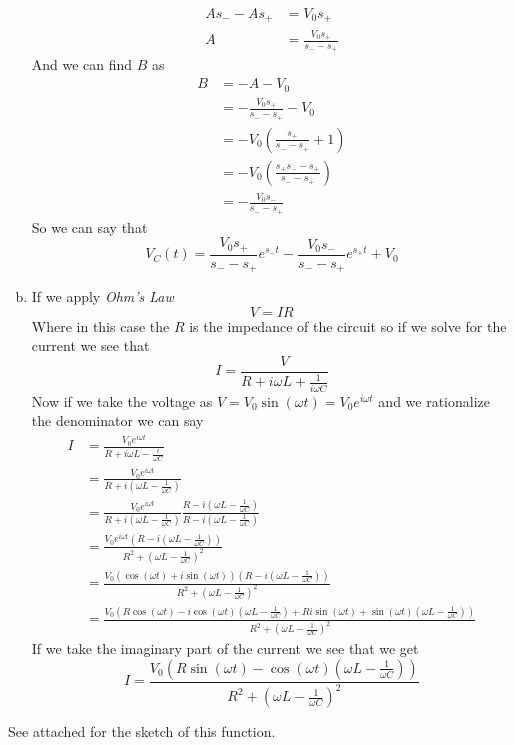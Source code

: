 \documentclass[11pt]{article}
\numberwithin{equation}{section}
\begin{document}
\begin{enumerate}[(a)]
\begin{align*}
As_- - As_+ &= V_0s_+\\
A &= \frac{V_0s_+}{s_- -s_+}
\end{align*}
And we can find $B$ as
\begin{align*}
B &= -A - V_0\\
&= -\frac{V_0s_+}{s_- -s_+} - V_0\\
&= -V_0\left(\frac{s_+}{s_- -s_+} +1\right)\\
&= -V_0\left(\frac{s_+ s_- - s_+}{s_- -s_+}\right)\\
&= -\frac{V_0s_-}{s_- -s_+}
\end{align*}
So we can say that
$$V_C(t) = \frac{V_0s_+}{s_- -s_+}e^{s_-t}-\frac{V_0s_-}{s_- -s_+}e^{s_+t}+V_0$$

\item
If we apply \emph{Ohm's Law}
\begin{equation}
V = IR
\end{equation}
Where in this case the $R$ is the impedance of the circuit so if we solve for the current we see that
$$I = \frac{V}{R+i\omega L + \frac{1}{i\omega C}}$$
Now if we take the voltage as $V = V_0\sin(\omega t)=V_0e^{i\omega t}$ and we rationalize the denominator we can say
\begin{align*}
I &= \frac{V_0e^{i\omega t}}{R+i\omega L - \frac{i}{\omega C}}\\
&= \frac{V_0e^{i\omega t}}{R+i\left(\omega L - \frac{1}{\omega C}\right)}\\
&= \frac{V_0e^{i\omega t}}{R+i\left(\omega L - \frac{1}{\omega C}\right)} \frac{R-i\left(\omega L - \frac{1}{\omega C}\right)}{R-i\left(\omega L - \frac{1}{\omega C}\right)}\\
&= \frac{V_0e^{i\omega t}\left(R-i\left(\omega L - \frac{1}{\omega C}\right)\right)}{R^2+\left(\omega L - \frac{1}{\omega C}\right)^2} \\
&= \frac{V_0(\cos(\omega t)+i\sin(\omega t))\left(R-i\left(\omega L - \frac{1}{\omega C}\right)\right)}{R^2+\left(\omega L - \frac{1}{\omega C}\right)^2} \\
&= \frac{V_0\left(R\cos(\omega t)-i\cos(\omega t)\left(\omega L - \frac{1}{\omega C}\right) + Ri\sin(\omega t)+\sin(\omega t)\left(\omega L - \frac{1}{\omega C}\right)\right)}{R^2+\left(\omega L - \frac{1}{\omega C}\right)^2} 
\end{align*}
If we take the imaginary part of the current we see that we get
$$I = \frac{V_0\left(R\sin(\omega t)-\cos(\omega t)\left(\omega L - \frac{1}{\omega C}\right)\right)}{R^2+\left(\omega L - \frac{1}{\omega C}\right)^2} $$
\end{enumerate}
See attached for the sketch of this function.
\end{document}

